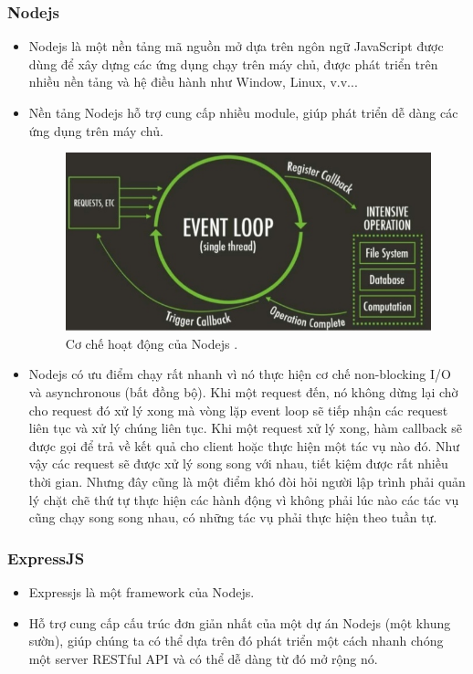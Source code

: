 \documentclass[a4paper,12pt,oneside]{article}
\begin{document}
\subsubsection{Nodejs \cite{nodejs}}
\begin{itemize}
\item Nodejs là một nền tảng mã nguồn mở dựa trên ngôn ngữ JavaScript được dùng để xây dựng các ứng dụng chạy trên máy chủ, được phát triển trên nhiều nền tảng và hệ điều hành như Window, Linux, v.v... 
\item Nền tảng Nodejs hỗ trợ cung cấp nhiều module, giúp phát triển dễ dàng các ứng dụng trên máy chủ.

\begin{figure}[H]
	\centering
	\includegraphics[scale=.8]{hinh/nodejs.png}
	\caption{Cơ chế hoạt động của Nodejs \cite{nodejs}.}
	\label{fig:nodejs}
\end{figure}

\item Nodejs có ưu điểm chạy rất nhanh vì nó thực hiện cơ chế non-blocking I/O và asynchronous (bất đồng bộ). Khi một request đến, nó không dừng lại chờ cho request đó xử lý xong mà vòng lặp event loop sẽ tiếp nhận các request liên tục và xử lý chúng liên tục. Khi một request xử lý xong, hàm callback sẽ được gọi để trả về kết quả cho client hoặc thực hiện một tác vụ nào đó. Như vậy các request sẽ được xử lý song song với nhau, tiết kiệm được rất nhiều thời gian. Nhưng đây cũng là một điểm khó đòi hỏi người lập trình phải quản lý chặt chẽ thứ tự thực hiện các hành động vì không phải lúc nào các tác vụ cũng chạy song song nhau, có những tác vụ phải thực hiện theo tuần tự.
\end{itemize}

\subsubsection{ExpressJS \cite{expressjs}}
\begin{itemize}
\item Expressjs là một framework của Nodejs.
\item Hỗ trợ cung cấp cấu trúc đơn giản nhất của một dự án Nodejs (một khung sườn), giúp chúng ta có thể dựa trên đó phát triển một cách nhanh chóng một server RESTful API và có thể dễ dàng từ đó mở rộng nó.
\end{itemize}
\end{document}
